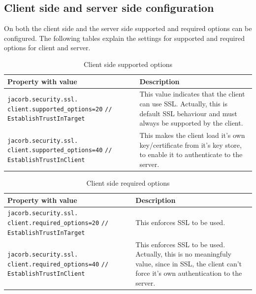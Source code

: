\subsection{Client side and server side configuration}
On both the client side and the server side supported and required
options can be configured. The following tables explain the settings
for supported and required options for client and server.

\begin{table}
\caption{Client side supported options}
\begin{tabular}{|p{7cm}|p{7cm}|}
\hline
\textbf{Property with value}& \textbf{Description}\\
\hline
\verb"jacorb.security.ssl."
\verb"client.supported_options=20"
\verb"// EstablishTrustInTarget"& This value indicates that the client can use SSL. Actually, this
is default SSL behaviour and must always be supported by the client.\\
\hline
\verb"jacorb.security.ssl."
\verb"client.supported_options=40"
\verb"// EstablishTrustInClient"& This makes
the client load it's own key/certificate from it's key
store, to enable it to authenticate to the server. \\
\hline
\end{tabular}
\end{table}


\begin{table}
\caption{Client side required options}
\begin{tabular}{|p{7cm}|p{7cm}|}
\hline
\textbf{Property with value}& \textbf{Description}\\
\hline
\verb"jacorb.security.ssl."
\verb"client.required_options=20"
\verb"// EstablishTrustInTarget"& This enforces SSL to be used.\\
\hline
\verb"jacorb.security.ssl."
\verb"client.required_options=40"
\verb"// EstablishTrustInClient"& This
enforces SSL to be used. Actually, this is no meaningfuly
value, since in SSL, the client can't force it's own authentication to
the server. \\
\hline
\end{tabular}
\end{table}

